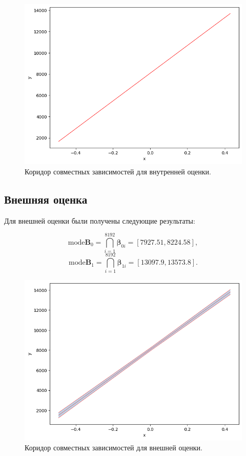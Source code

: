 \documentclass{article}
\begin{document}
  \begin{figure}[htbp!]
		\begin{center}
			\includegraphics[width = \textwidth]{int_est}
			\caption{Коридор совместных зависимостей для внутренней оценки.}
      \label{figure:int_est}
		\end{center}
	\end{figure}

  \subsection{Внешняя оценка}

  Для внешней оценки были получены следующие результаты:

  \[
    \text{mode} \mathbf{B}_0 = \bigcap_{i=1}^{8192} \mathbf{\beta}_{0i}
      = [7927.51, 8224.58],
  \]
  \[
    \text{mode} \mathbf{B}_1 = \bigcap_{i=1}^{8192} \mathbf{\beta}_{1i}
      = [13097.9, 13573.8].
  \]

  \begin{figure}[htbp!]
		\begin{center}
			\includegraphics[width = \textwidth]{ext_est}
			\caption{Коридор совместных зависимостей для внешней оценки.}
      \label{figure:ext_est}
		\end{center}
	\end{figure}
\end{document}
